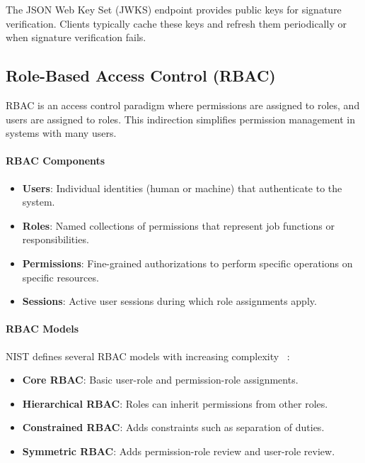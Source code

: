 \documentclass[a4paper,twoside]{sapthesis}
\begin{document}
The JSON Web Key Set (JWKS) endpoint provides public keys for signature verification. Clients typically cache these keys and refresh them periodically or when signature verification fails.

\subsection{Role-Based Access Control (RBAC)}

RBAC is an access control paradigm where permissions are assigned to roles, and users are assigned to roles. This indirection simplifies permission management in systems with many users.

\paragraph{RBAC Components}

\begin{itemize}
    \item \textbf{Users}: Individual identities (human or machine) that authenticate to the system.
    \item \textbf{Roles}: Named collections of permissions that represent job functions or responsibilities.
    \item \textbf{Permissions}: Fine-grained authorizations to perform specific operations on specific resources.
    \item \textbf{Sessions}: Active user sessions during which role assignments apply.
\end{itemize}

\paragraph{RBAC Models}

NIST defines several RBAC models with increasing complexity~\cite{nist2004rbac}
:

\begin{itemize}
    \item \textbf{Core RBAC}: Basic user-role and permission-role assignments.
    \item \textbf{Hierarchical RBAC}: Roles can inherit permissions from other roles.
    \item \textbf{Constrained RBAC}: Adds constraints such as separation of duties.
    \item \textbf{Symmetric RBAC}: Adds permission-role review and user-role review.
\end{itemize}
\end{document}
